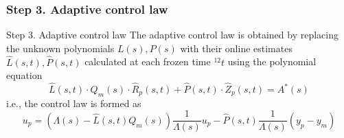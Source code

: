 \documentclass[10pt]{article}
\begin{document}
\begin{multicols*}{2}
\subsubsection{Step 3. Adaptive control law}
Step 3. Adaptive control law The adaptive control law is obtained by replacing the unknown polynomials $L(s), P(s)$ with their online estimates $\hat{L}(s, t), \hat{P}(s, t)$ calculated at each frozen time ${ }^{12} t$ using the polynomial equation
\[
\hat{L}(s, t) \cdot Q_m(s) \cdot \hat{R}_p(s, t)+\hat{P}(s, t) \cdot \hat{Z}_p(s, t)=A^*(s)
\]
i.e., the control law is formed as
\[
u_p=\left(\Lambda(s)-\hat{L}(s, t) Q_m(s)\right) \frac{1}{\Lambda(s)} u_p-\hat{P}(s, t) \frac{1}{\Lambda(s)}\left(y_p-y_m\right)
\]



















\end{multicols*}
\end{document}
